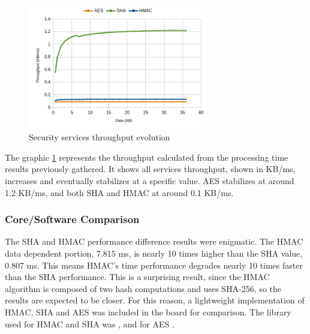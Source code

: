 \begin{figure}[h!]
	\centering
	\includegraphics[width=0.7\textwidth]{./Images/core-tput.png}
	\caption{Security services throughput evolution}
	\label{fig:performance:core-tput}
\end{figure}

The graphic \ref{fig:performance:core-tput} represents the throughput calculated from the processing time results previously gathered. It shows all services throughput, shown in KB/ms, increases and eventually stabilizes at a specific value. AES stabilizes at around 1.2 KB/ms, and both SHA and HMAC at around 0.1 KB/ms.

\subsubsection{Core/Software Comparison}\label{chap:evaluation:services:software}

The SHA and HMAC performance difference results were enigmatic. The HMAC data dependent portion, 7.815 ms, is nearly 10 times higher than the SHA value, 0.807 ms. This means HMAC's time performance degrades nearly 10 times faster than the SHA performance. This is a surprising result, since the HMAC algorithm is composed of two hash computations and uses SHA-256, so the results are expected to be closer.
For this reason, a lightweight implementation of HMAC, SHA and AES was included in the board for comparison. The library used for HMAC and SHA was \cite{ogayHMAC}, and for AES \cite{tinycrypt}. 

